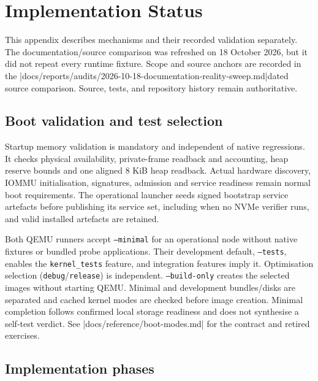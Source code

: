 \chapter{Implementation Status}

This appendix describes mechanisms and their recorded validation separately.
The documentation/source comparison was refreshed on 18 October 2026, but it did not
repeat every runtime fixture. Scope and source anchors are recorded in
the \repofiletext|docs/reports/audits/2026-10-18-documentation-reality-sweep.md|{dated source comparison}.
Source, tests, and repository history remain authoritative.

\section{Boot validation and test selection}

Startup memory validation is mandatory and independent of native regressions.
It checks physical availability, private-frame readback and accounting, heap
reserve bounds and one aligned 8 KiB heap readback. Actual hardware discovery,
IOMMU initialisation, signatures, admission and service readiness remain normal
boot requirements. The operational launcher seeds signed bootstrap service
artefacts before publishing its service set, including when no NVMe verifier
runs, and valid installed artefacts are retained.

Both QEMU runners accept \texttt{--minimal} for an operational node without
native fixtures or bundled probe applications. Their development default,
\texttt{--tests}, enables the \texttt{kernel\_tests} feature, and integration features
imply it. Optimisation selection (\texttt{debug}/\texttt{release}) is independent.
\texttt{--build-only} creates the selected images without starting QEMU.
Minimal and development bundles/disks are separated and cached kernel modes
are checked before image creation. Minimal completion follows confirmed local
storage readiness and does not synthesise a self-test verdict. See
\repofile|docs/reference/boot-modes.md| for the contract and retired exercises.

\section{Implementation phases}

